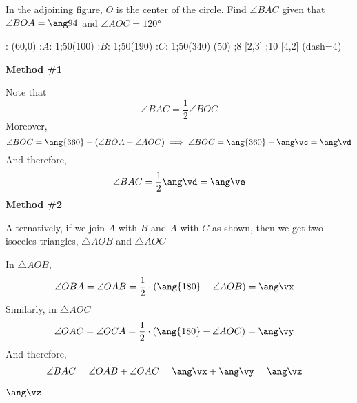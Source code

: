 

\ADD\va\vb\vc 
{}\vc\vd
\DIVIDE{}\ve
\EXPR[0]
\EXPR[0]
\ADD\vx\vy\vz

\question[3]  In the adjoining figure, $O$ is the center of the circle. Find $\angle BAC$
given that $\angle BOA = \ang\va$ and $\angle AOC = \ang{120}$

\watchout

  : (60,0)
  :$A$: 1;50(100)
  :$B$: 1;50(190)
  :$C$: 1;50(340)
\figdrawbegin{}
(50)
  \figdrawline [1,2]
  \figdrawline [1,3]
  \figdrawline [1,4]
  ;8 [2,3]
  ;10 [4,2]
  \ifprintanswers
    \figset (dash=4)
    \figdrawline [3,2,4]
  \fi
\figdrawend
{}

\ifprintanswers
  \begin{marginfigure}
    \centerline{\box\figBoxA}
  \end{marginfigure}
\else
  \vspace{1cm}
  \centerline{\box\figBoxA}
\fi

\begin{solution}[\halfpage]
  \textbf{Method \#1}

  Note that 
  \[ \angle BAC = \dfrac{1}{2}\angle BOC \]
  Moreover, 
  \[ \angle BOC = \ang{360} - (\angle BOA + \angle AOC) \implies \angle BOC = \ang{360}-\ang\vc = \ang\vd \]
  And therefore, 
  \[ \angle BAC = \dfrac{1}{2}\ang\vd = \ang\ve \]
  \textbf{Method \#2}

	Alternatively, if we join $A$ with $B$ and $A$ with $C$ as shown, then we get two isoceles 
	triangles, $\triangle AOB$ and $\triangle AOC$
	
	In $\triangle AOB$,
	\begin{align}
		\angle OBA = \angle OAB &= \dfrac{1}{2}\cdot(\ang{180}-\angle AOB) = \ang\vx
	\end{align}
	Similarly, in $\triangle AOC$
	\begin{align}
		\angle OAC = \angle OCA &= \dfrac{1}{2}\cdot(\ang{180}-\angle AOC) = \ang\vy
	\end{align}
	And therefore,
	\begin{align}
		\angle BAC &= \angle OAB + \angle OAC = \ang\vx + \ang\vy = \ang\vz
	\end{align}
\end{solution}

\ifprintanswers\begin{codex}$\ang\vz$\end{codex}\fi
